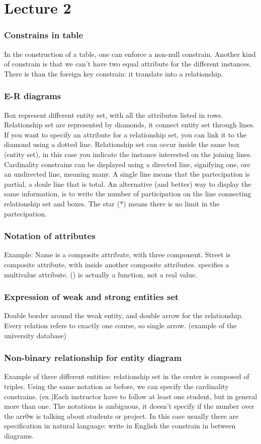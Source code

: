 \documentclass[11pt]{report}
\theoremstyle{definition}
\theoremstyle{remark}
\begin{document}
\chapter{Lecture 2}
\subsection*{Constrains in table}
In the construction of a table, one can enforce a non-null constrain. Another kind of constrain is that we can't have two equal attribute for the different instances.
There is than the foreign key constrain: it translate into a relationship. 
\subsection*{E-R diagrams}
Box represent different entity set, with all the attributes listed in rows. Relationship set are represented by diamonds, it connect entity set through lines. If you want to specify an attribute for a relationship set, you can link it to the diamond using a dotted line. Relationship set can occur inside the same box (entity set), in this case you indicate the instance interested on the joining lines.
Cardinality constrains can be displayed using a directed line, signifying one, ore an undirected line, meaning many. A single line means that the partecipation is partial, a doule line that is total. An alternative (and better) way to display the same information, is to write the number of participation on the line connecting relationship set and boxes. The star (*) means there is no limit in the partecipation.
\subsection*{Notation of attributes}
Example: Name is a composite attribute, with three component.
Street is composite attribute, with inside another composite attributes. 
{} specifies a multivalue attribute.
() is actually a function, not a real value. 
\subsection*{Expression of weak and strong entities set}
Double border around the weak entity, and double arrow for the relationship. Every relation refers to exactly one course, so single arrow. (example of the university database)
\subsection*{Non-binary relationship for entity diagram}
Example of three different entities: relationship set in the center is composed of triples. Using the same notation as before, we can specify the cardinality constrains. (ex.)Each instructor have to follow at least one student, but in general more than one. The notations is ambiguous, it doesn't specify if the number over the arr0w is talking about students or project. In this case usually there are specification in natural language: write in English the constrain in between diagrams. 
\end{document}
